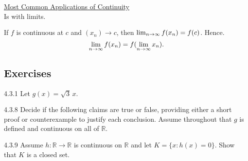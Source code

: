 \begin{center}
    \underline{Most Common Applications of Continuity} \\

    Is with limits.
\end{center}

If \(f\) is continuous at \(c\) and \((x_n) \to c\), then \(\lim_{n \rightarrow \infty}f(x_n) = f(c)\). Hence.
\[
    \lim_{n \rightarrow \infty}f(x_n) = f(\lim_{n \rightarrow \infty}x_n).
\]

\renewcommand{\theenumi}{\alph{enumi}}
\renewcommand{\labelenumi}{(\theenumi)}
\subsection{Exercises}

\begin{exercise}
    {4.3.1} Let \( g(x) = \sqrt{3} \, x \).
\end{exercise}


\begin{exercise}
    {4.3.8} Decide if the following claims are true or false, providing either a short proof or counterexample to justify each conclusion. Assume throughout that \( g \) is defined and continuous on all of \( \mathbb{R} \).
\end{exercise}


\begin{exercise}
    {4.3.9} Assume \( h : \mathbb{R} \to \mathbb{R} \) is continuous on \( \mathbb{R} \) and let \( K = \{x : h(x) = 0\} \). Show that \( K \) is a closed set.
\end{exercise}

